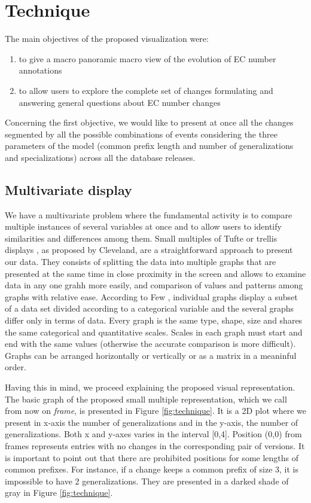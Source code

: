 \section{Technique}

The main objectives of the proposed visualization were:

\begin{enumerate}
\item to give a macro panoramic macro view of the evolution of EC number annotations
\item to allow users to explore the complete set of changes formulating and answering general questions about EC number changes
\end{enumerate}

Concerning the first objective, we would like to present at once all the changes segmented by all the possible combinations of events considering the three parameters of the model (common prefix length and number of generalizations and specializations) across all the database releases.

\subsection{Multivariate display}

We have a multivariate problem where the fundamental activity is to compare multiple instances of several variables at once and to allow users to identify similarities and differences among them. Small multiples of Tufte  \cite{tufte_envisioning} or trellis displays \cite{cleveland_trellis1,cleveland_trellis2}, as proposed by Cleveland, are a straightforward approach to present our data. They consists of splitting the data into multiple graphs that are presented at the same time in close proximity in the screen and allows to examine data in any one grahh more easily, and comparison of values and patterns among graphs with relative ease. 
According to Few \cite{few_nysi}, individual graphs display a subset of a data set divided according to a categorical variable and the several graphs differ only in terms of data. Every graph is the same type, shape, size and shares the same categorical and quantitative scales. Scales in each graph must start and end with the same values (otherwise the accurate comparison is more difficult). Graphs can be arranged horizontally or vertically or as a matrix in a meaninful order. 

Having this in mind, we proceed explaining the proposed visual representation. The basic graph of the proposed small multiple representation, which we call from now on \textit{frame}, is presented in Figure \ref{fig:technique}. It is a 2D plot where we present in x-axis the number of generalizations and in the y-axis, the number of generalizations. 
Both x and y-axes varies in the interval [0,4]. Position (0,0) from frames represents entries with no changes in the corresponding pair of versions. It is important to point out that there are prohibited positions for some lengths of common prefixes. For instance, if a change keeps a common prefix of size 3, it is impossible to have 2 generalizations. They are presented in a darked shade of gray in Figure \ref{fig:technique}.


